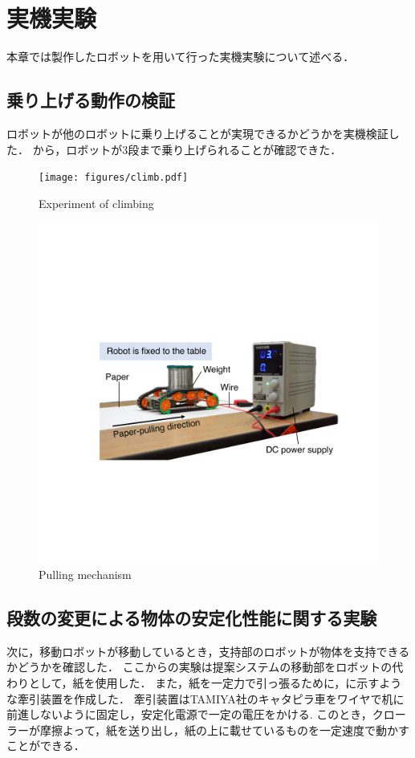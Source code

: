 \section{実機実験}
本章では製作したロボットを用いて行った実機実験について述べる．

\subsection{乗り上げる動作の検証}
ロボットが他のロボットに乗り上げることが実現できるかどうかを実機検証した．
から，ロボットが3段まで乗り上げられることが確認できた．
\begin{figure}[tb]
  \centering
  \texttt{[image: figures/climb.pdf]}
  \caption{Experiment of climbing}
  \label{fig:climb}
\end{figure}

\begin{figure}[tb]
  \centering
  \includegraphics[width=0.85\columnwidth]{figures/pulling-mechanism.pdf}
  \caption{Pulling mechanism}
  \label{fig:pulling-mechanism}
\end{figure}
\subsection{段数の変更による物体の安定化性能に関する実験}
次に，移動ロボットが移動しているとき，支持部のロボットが物体を支持できるかどうかを確認した．
ここからの実験は提案システムの移動部をロボットの代わりとして，紙を使用した．
また，紙を一定力で引っ張るために，に示すような牽引装置を作成した．
牽引装置はTAMIYA社のキャタピラ車をワイヤで机に前進しないように固定し，安定化電源で一定の電圧をかける. このとき，クローラーが摩擦よって，紙を送り出し，紙の上に載せているものを一定速度で動かすことができる．

